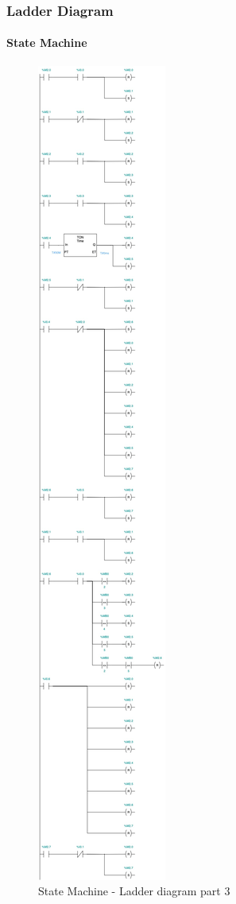 \documentclass[12pt]{beamer}
\begin{document}
\begin{frame}
\frametitle{Ladder Diagram}
\framesubtitle{State Machine}
\begin{figure}
    \centering
    \includegraphics[trim={0 76cm 0 22cm}, clip, scale=.5]{img/Ladder_diagram_2.jpg}
    \caption{State Machine - Ladder diagram part 3}
    \label{fig:ladder23}
\end{figure}
\end{frame}
\end{document}
